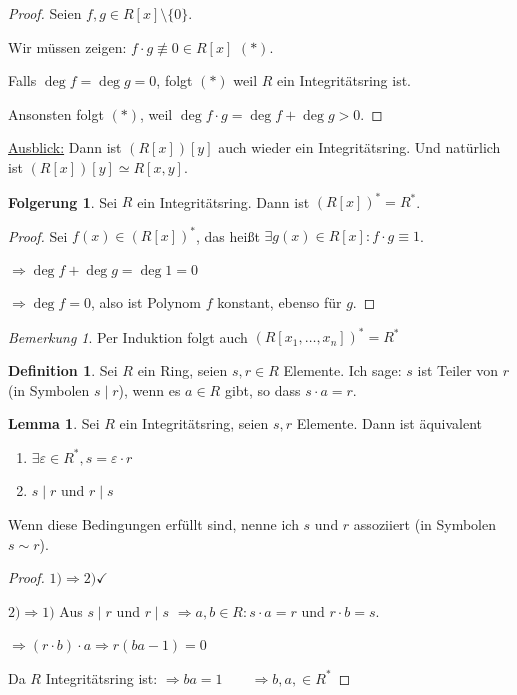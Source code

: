 \documentclass[12pt,parskip=full]{scrartcl}
\newcommand{\heading}{\underline}
\theoremstyle{definition}
\newtheorem{corollary}[theorem]{Folgerung}
\newtheorem{lemma}[theorem]{Lemma}
\newtheorem{definition}[theorem]{Definition}
\theoremstyle{remark}
\newtheorem*{remark}{Bemerkung}
\begin{document}
 	\begin{proof}
 		Seien $f,g \in R[x] \setminus \{0\}$.
 		
 		Wir müssen zeigen: $f \cdot g \not\equiv 0 \in R[x]$ $(*)$.
 		
 		Falls $\deg f = \deg g = 0$, folgt $(*)$ weil $R$ ein Integritätsring ist.
 		
 		Ansonsten folgt $(*)$, weil $\deg f \cdot g = \deg f + \deg g > 0$.
 	\end{proof}
 
 	\heading{Ausblick:} Dann ist $(R[x])[y]$ auch wieder ein Integritätsring. Und natürlich ist $(R[x])[y] \simeq R[x,y]$.
 	
 	\begin{corollary}
 		Sei $R$ ein Integritätsring. Dann ist $(R[x])^* = R^*$.
 	\end{corollary}
 
 	\begin{proof}
 		Sei $f(x) \in (R[x])^*$, das heißt $\exists g(x) \in R[x]: f \cdot g \equiv 1$.
 		
 		$\Rightarrow \deg f + \deg g = \deg 1 = 0$
 		
 		$\Rightarrow \deg f = 0$, also ist Polynom $f$ konstant, ebenso für $g$. 
 	\end{proof}
 
 	\begin{remark}
 		Per Induktion folgt auch $(R[x_1, \dots, x_n])^* = R^*$
 	\end{remark}
 
 	\begin{definition}
 		Sei $R$ ein Ring, seien $s, r \in R$ Elemente. Ich sage: $s$ ist Teiler von $r$ (in Symbolen $s \mid r$), wenn es $a \in R$ gibt, so dass $s \cdot a = r$.
 	\end{definition}
 
 	\begin{lemma}
 		Sei $R$ ein Integritätsring, seien $s,r$ Elemente. Dann ist äquivalent
 		\begin{enumerate}
 			\item $\exists \varepsilon \in R^*, s = \varepsilon \cdot r$
 			\item $s \mid r$ und $r \mid s$
 		\end{enumerate}
 	
 	Wenn diese Bedingungen erfüllt sind, nenne ich $s$ und $r$ assoziiert (in Symbolen $s \sim r$).
 	\end{lemma}
 
 	\begin{proof}
 		$1) \Rightarrow 2) \checkmark$
 		
 		$2) \Rightarrow 1)$ Aus $s \mid r$ und $r \mid s$ $\Rightarrow a,b \in R: s \cdot a = r$ und $r \cdot b = s$.
 		
 		$\Rightarrow (r \cdot b) \cdot a \Rightarrow r(ba - 1) = 0$
 		
 		Da $R$ Integritätsring ist: $\Rightarrow ba = 1 \qquad \Rightarrow b,a, \in R^*$
 	\end{proof}
 
\end{document}
